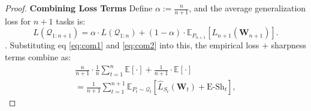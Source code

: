 \documentclass[letterpaper]{article} %
\begin{document}
\begin{proof}


\textbf{Combining Loss Terms}
Define $\alpha := \frac{n}{n+1}$, and the average generalization loss for $n+1$ tasks is:
\[
L(\mathcal{Q}_{1:n+1}) = \alpha \cdot L(\mathcal{Q}_{1:n}) + (1-\alpha) \cdot \mathbb{E}_{P_{n+1}}[L_{n+1}(\mathbf{W}_{n+1})].\]. Substituting eq \ref{eq:com1} and \ref{eq:com2} into this, the empirical loss + sharpness terms combine as: 
\begin{equation}
\begin{aligned}
        \frac{n}{n+1} \cdot \frac{1}{n} \sum_{t=1}^n \mathbb{E}[\cdot] + \frac{1}{n+1} \cdot \mathbb{E}[\cdot] \\
    = \frac{1}{n+1} \sum_{t=1}^{n+1} \mathbb{E}_{P_t \sim \mathcal{Q}_t} \left[ \widehat{L}_{S_t}(\mathbf{W}_t) + \mathrm{E\text{-}Sh}_t \right],
\end{aligned}
\end{equation}




\end{proof}
\end{document}
